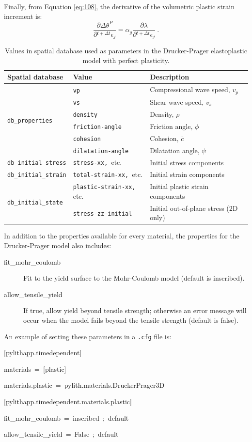 Finally, from Equation \ref{eq:108}, the derivative of the volumetric
plastic strain increment is:
\begin{equation}
\frac{\partial\Delta\theta^{P}}{\partial\phantom{}^{t+\Delta t}\epsilon_{j}}=\alpha_{g}\frac{\partial\lambda}{\partial\phantom{}^{t+\Delta t}\epsilon_{j}}\:.\label{eq:126}
\end{equation}
\begin{table}
\centering{}\caption{\label{tab:druckerPrager}Values in spatial database used as parameters
in the Drucker-Prager elastoplastic model with perfect plasticity.}
\begin{tabular}{|l|l|l|}
\hline 
\textbf{Spatial database} & \textbf{Value} & \textbf{Description}\tabularnewline
\hline 
\hline 
\multirow{6}{*}{\texttt{db\_properties}} & \texttt{vp} & Compressional wave speed, $v_{p}$\tabularnewline
\cline{2-3} 
 & \texttt{vs} & Shear wave speed, $v_{s}$\tabularnewline
\cline{2-3} 
 & \texttt{density} & Density, $\rho$\tabularnewline
\cline{2-3} 
 & \texttt{friction-angle} & Friction angle, $\phi$\tabularnewline
\cline{2-3} 
 & \texttt{cohesion} & Cohesion, $\bar{c}$\tabularnewline
\cline{2-3} 
 & \texttt{dilatation-angle} & Dilatation angle, $\psi$\tabularnewline
\hline 
\texttt{db\_initial\_stress} & \texttt{stress-xx, }etc. & Initial stress components\tabularnewline
\hline 
\texttt{db\_initial\_strain} & \texttt{total-strain-xx, }etc. & Initial strain components\tabularnewline
\hline 
\multirow{2}{*}{\texttt{db\_initial\_state}} & \texttt{plastic-strain-xx, }etc. & Initial plastic strain components\tabularnewline
\cline{2-3} 
 & \texttt{stress-zz-initial} & Initial out-of-plane stress (2D only)\tabularnewline
\hline 
\end{tabular}
\end{table}


In addition to the properties available for every material, the properties
for the Drucker-Prager model also includes:
\begin{description}
\item [{fit\_mohr\_coulomb}] Fit to the yield surface to the Mohr-Coulomb
model (default is inscribed).
\item [{allow\_tensile\_yield}] If true, allow yield beyond tensile strength;
otherwise an error message will occur when the model fails beyond
the tensile strength (default is false).
\end{description}
An example of setting these parameters in a \texttt{.cfg} file is:
\begin{lyxcode}
{[}pylithapp.timedependent{]}

materials~=~{[}plastic{]}

materials.plastic~=~pylith.materials.DruckerPrager3D



{[}pylithapp.timedependent.materials.plastic{]}

fit\_mohr\_coulomb~=~inscribed~;~default

allow\_tensile\_yield~=~False~;~default\end{lyxcode}

